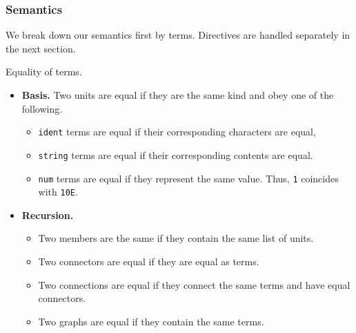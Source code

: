 

\subsubsection*{Semantics}
We break down our semantics first by terms. Directives are handled separately in the next section.
\begin{definition}
Equality of terms.
\begin{itemize}
  \item \textbf{Basis.} Two units are equal if they are the same kind and obey one of the following.
	\begin{itemize}
	  \item \texttt{ident} terms are equal if their corresponding characters are equal,
    \item \texttt{string} terms are equal if their corresponding contents are equal.
	  \item \texttt{num} terms are equal if they represent the same value. Thus, \texttt{1} coincides with \texttt{10E}.
	\end{itemize}
  \item \textbf{Recursion.}
        \begin{itemize}
        \item Two members are the same if they contain the same list of units. %
        \item Two connectors are equal if they are equal as terms. %
 		  \item Two connections are equal if they connect the same terms and have equal connectors.
		  \item Two graphs are equal if they contain the same terms.
	\end{itemize}
\end{itemize}
\end{definition}
